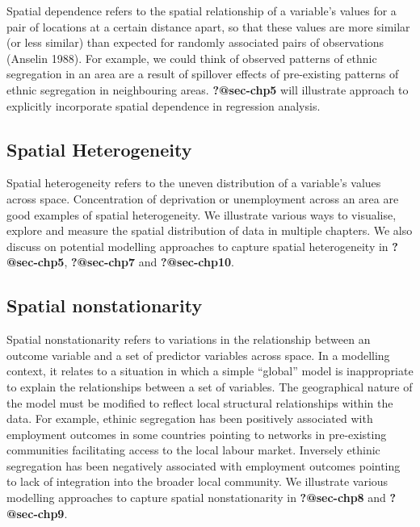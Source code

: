 \documentclass[
  letterpaper,
  krantz2]{style/krantz}
\begin{document}
Spatial dependence refers to the spatial relationship of a variable's
values for a pair of locations at a certain distance apart, so that
these values are more similar (or less similar) than expected for
randomly associated pairs of observations (Anselin 1988). For example,
we could think of observed patterns of ethnic segregation in an area are
a result of spillover effects of pre-existing patterns of ethnic
segregation in neighbouring areas. \textbf{?@sec-chp5} will illustrate
approach to explicitly incorporate spatial dependence in regression
analysis.

\hypertarget{spatial-heterogeneity}{%
\subsection{Spatial Heterogeneity}\label{spatial-heterogeneity}}

Spatial heterogeneity refers to the uneven distribution of a variable's
values across space. Concentration of deprivation or unemployment across
an area are good examples of spatial heterogeneity. We illustrate
various ways to visualise, explore and measure the spatial distribution
of data in multiple chapters. We also discuss on potential modelling
approaches to capture spatial heterogeneity in \textbf{?@sec-chp5},
\textbf{?@sec-chp7} and \textbf{?@sec-chp10}.

\hypertarget{spatial-nonstationarity}{%
\subsection{Spatial nonstationarity}\label{spatial-nonstationarity}}

Spatial nonstationarity refers to variations in the relationship between
an outcome variable and a set of predictor variables across space. In a
modelling context, it relates to a situation in which a simple
``global'' model is inappropriate to explain the relationships between a
set of variables. The geographical nature of the model must be modified
to reflect local structural relationships within the data. For example,
ethinic segregation has been positively associated with employment
outcomes in some countries pointing to networks in pre-existing
communities facilitating access to the local labour market. Inversely
ethinic segregation has been negatively associated with employment
outcomes pointing to lack of integration into the broader local
community. We illustrate various modelling approaches to capture spatial
nonstationarity in \textbf{?@sec-chp8} and \textbf{?@sec-chp9}.
\end{document}
